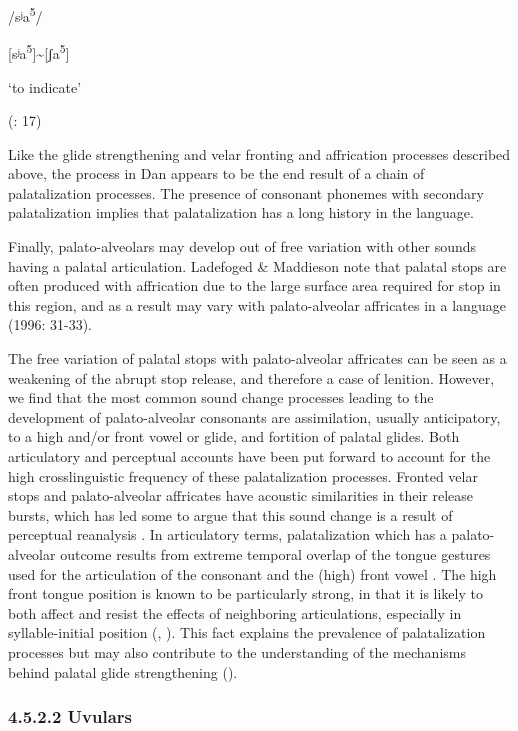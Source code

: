 /sʲa\textsuperscript{5}/

[sʲa\textsuperscript{5}]{\textasciitilde}[ʃa\textsuperscript{5}]

‘to indicate’

(\citealt{BearthZemp1967}: 17)

\z

Like the glide strengthening and velar fronting and affrication processes described above, the process in Dan appears to be the end result of a chain of palatalization processes. The presence of consonant phonemes with secondary palatalization implies that palatalization has a long history in the language.

  Finally, palato-alveolars may develop out of free variation with other sounds having a palatal articulation. Ladefoged \& Maddieson note that palatal stops are often produced with affrication due to the large surface area required for stop in this region, and as a result may vary with palato-alveolar affricates in a language (1996: 31-33).

  The free variation of palatal stops with palato-alveolar affricates can be seen as a weakening of the abrupt stop release, and therefore a case of lenition. However, we find that the most common sound change processes leading to the development of palato-alveolar consonants are assimilation, usually anticipatory, to a high and/or front vowel or glide, and fortition of palatal glides. Both articulatory and perceptual accounts have been put forward to account for the high crosslinguistic frequency of these palatalization processes. Fronted velar stops and palato-alveolar affricates have acoustic similarities in their release bursts, which has led some to argue that this sound change is a result of perceptual reanalysis \citep{Guion1998}. In articulatory terms, palatalization which has a palato-alveolar outcome results from extreme temporal overlap of the tongue gestures used for the articulation of the consonant and the (high) front vowel \citep{Bateman2007}. The high front tongue position is known to be particularly strong, in that it is likely to both affect and resist the effects of neighboring articulations, especially in syllable-initial position (\citealt{RecasensEspinosa2009}, \citealt{Recasens2014}). This fact explains the prevalence of palatalization processes but may also contribute to the understanding of the mechanisms behind palatal glide strengthening (\citealt{BybeeEasterday2019}).

\subsubsection{\textbf{4.5.2.2} \textbf{Uvulars}}

